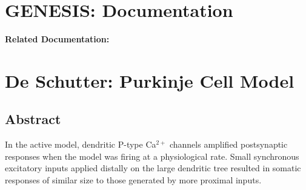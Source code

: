 \documentclass[12pt]{article}
\begin{document}
\section*{GENESIS: Documentation}

{\bf Related Documentation:}

\section*{De Schutter: Purkinje Cell Model}

\subsection*{Abstract}

In the active model, dendritic P-type Ca$^{2+}$ channels amplified postsynaptic responses when the model was firing at a physiological rate. Small synchronous excitatory inputs applied distally on the large dendritic tree resulted in somatic responses of similar size to those generated by more proximal inputs.
\end{document}
